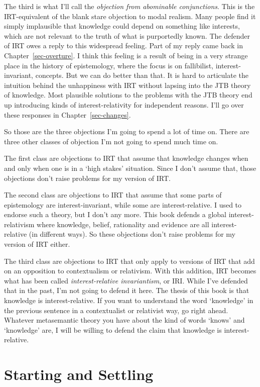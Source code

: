 \documentclass[
  10pt,
  letterpaper,
  twoside]{scrbook}
\begin{document}
The third is what I'll call the \emph{objection from abominable
conjunctions}. This is the IRT-equivalent of the blank stare objection
to modal realism. Many people find it simply implausible that knowledge
could depend on something like interests, which are not relevant to the
truth of what is purportedly known. The defender of IRT owes a reply to
this widespread feeling. Part of my reply came back in
Chapter~\ref{sec-overture}. I think this feeling is a result of being in
a very strange place in the history of epistemology, where the focus is
on fallibilist, interest-invariant, concepts. But we can do better than
that. It is hard to articulate the intuition behind the unhappiness with
IRT without lapsing into the JTB theory of knowledge. Most plausible
solutions to the problems with the JTB theory end up introducing kinds
of interest-relativity for independent reasons. I'll go over these
responses in Chapter~\ref{sec-changes}.

So those are the three objections I'm going to spend a lot of time on.
There are three other classes of objection I'm not going to spend much
time on.

The first class are objections to IRT that assume that knowledge changes
when and only when one is in a `high stakes' situation. Since I don't
assume that, those objections don't raise problems for my version of
IRT.

The second class are objections to IRT that assume that some parts of
epistemology are interest-invariant, while some are interest-relative. I
used to endorse such a theory, but I don't any more. This book defends a
global interest-relativism where knowledge, belief, rationality and
evidence are all interest-relative (in different ways). So these
objections don't raise problems for my version of IRT either.

The third class are objections to IRT that only apply to versions of IRT
that add on an opposition to contextualism or relativism. With this
addition, IRT becomes what has been called \emph{interest-relative
invariantism}, or IRI. While I've defended that in the past, I'm not
going to defend it here. The thesis of this book is that knowledge is
interest-relative. If you want to understand the word `knowledge' in the
previous sentence in a contextualist or relativist way, go right ahead.
Whatever metasemantic theory you have about the kind of words `knows'
and `knowledge' are, I will be willing to defend the claim that
knowledge is interest-relative.

\section{Starting and Settling}\label{sec-settling}
\end{document}
